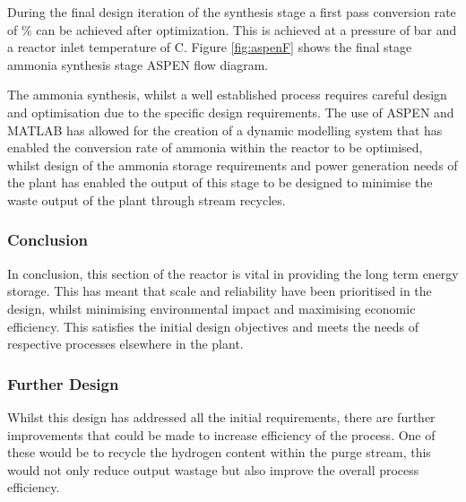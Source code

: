 During the final design iteration of the synthesis stage a first pass conversion rate of \conv \% can be achieved after optimization. This is achieved at a pressure of \pbar  bar and a reactor inlet temperature of \tc\textdegree C. Figure \ref{fig:aspenF} shows the final stage ammonia synthesis stage ASPEN flow diagram. 

 The ammonia synthesis, whilst a well established process requires careful design and optimisation due to the specific design requirements. The use of ASPEN and MATLAB has allowed for the creation of a dynamic modelling system that has enabled the conversion rate of ammonia within the reactor to be optimised, whilst design of the ammonia storage requirements and power generation needs of the plant has enabled the output of this stage to be designed to minimise the waste output of the plant through stream recycles.

\subsubsection{Conclusion}

In conclusion, this section of the reactor is vital in providing the long term energy storage. This has meant that scale and reliability have been prioritised in the design, whilst minimising environmental impact and maximising economic efficiency. This satisfies the initial design objectives and meets the needs of respective processes elsewhere in the plant. 


\subsubsection{Further Design}
Whilst this design has addressed all the initial requirements, there are further improvements that could be made to increase efficiency of the process. One of these would be to recycle the hydrogen content within the purge stream, this would not only reduce output wastage but also improve the overall process efficiency. 



%